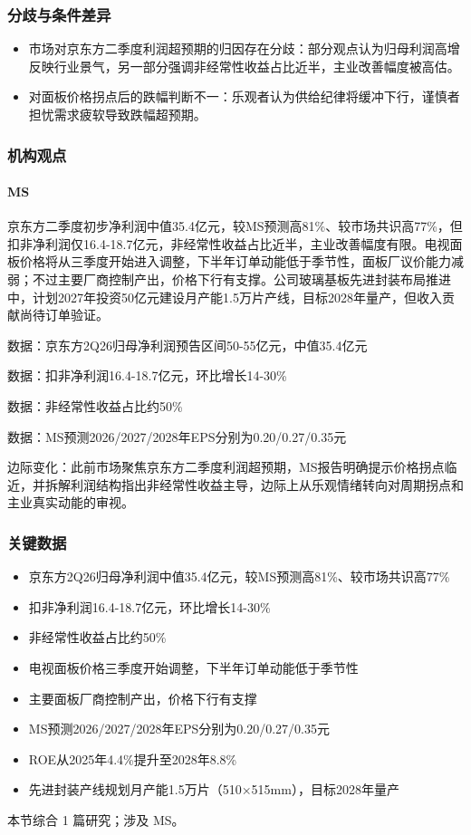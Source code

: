 \documentclass[11pt]{ctexart}
\begin{document}
\subsubsection*{分歧与条件差异}
\begin{itemize}
  \item 市场对京东方二季度利润超预期的归因存在分歧：部分观点认为归母利润高增反映行业景气，另一部分强调非经常性收益占比近半，主业改善幅度被高估。
  \item 对面板价格拐点后的跌幅判断不一：乐观者认为供给纪律将缓冲下行，谨慎者担忧需求疲软导致跌幅超预期。
\end{itemize}
\subsubsection*{机构观点}
\paragraph{MS} 京东方二季度初步净利润中值35.4亿元，较MS预测高81\%、较市场共识高77\%，但扣非净利润仅16.4-18.7亿元，非经常性收益占比近半，主业改善幅度有限。电视面板价格将从三季度开始进入调整，下半年订单动能低于季节性，面板厂议价能力减弱；不过主要厂商控制产出，价格下行有支撑。公司玻璃基板先进封装布局推进中，计划2027年投资50亿元建设月产能1.5万片产线，目标2028年量产，但收入贡献尚待订单验证。
{\small\color{refgray}数据：京东方2Q26归母净利润预告区间50-55亿元，中值35.4亿元\par}
{\small\color{refgray}数据：扣非净利润16.4-18.7亿元，环比增长14-30\%\par}
{\small\color{refgray}数据：非经常性收益占比约50\%\par}
{\small\color{refgray}数据：MS预测2026/2027/2028年EPS分别为0.20/0.27/0.35元\par}
{\small\color{refgray}边际变化：此前市场聚焦京东方二季度利润超预期，MS报告明确提示价格拐点临近，并拆解利润结构指出非经常性收益主导，边际上从乐观情绪转向对周期拐点和主业真实动能的审视。\par}
\subsubsection*{关键数据}
\begin{itemize}
  \item 京东方2Q26归母净利润中值35.4亿元，较MS预测高81\%、较市场共识高77\%
  \item 扣非净利润16.4-18.7亿元，环比增长14-30\%
  \item 非经常性收益占比约50\%
  \item 电视面板价格三季度开始调整，下半年订单动能低于季节性
  \item 主要面板厂商控制产出，价格下行有支撑
  \item MS预测2026/2027/2028年EPS分别为0.20/0.27/0.35元
  \item ROE从2025年4.4\%提升至2028年8.8\%
  \item 先进封装产线规划月产能1.5万片（510×515mm），目标2028年量产
\end{itemize}
{\small\color{refgray}本节综合 1 篇研究；涉及 MS。}
\newpage
\end{document}
